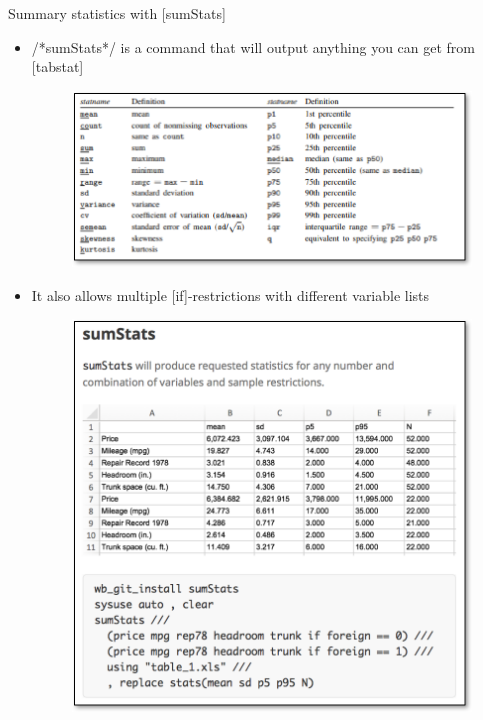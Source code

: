 \documentclass[aspectratio=169]{beamer}
\begin{document}
\begin{frame}[fragile]{Summary statistics with [sumStats]}
\begin{multicols}{2}	
	\begin{itemize}
		\item /*sumStats*/ is a command that will output anything you can get from [tabstat]
			\begin{figure}
				\centering
				\includegraphics[width=\linewidth]{img/sumstats}
			\end{figure}
		\item It also allows multiple [if]-restrictions with different variable lists
		\begin{figure}
			\centering
			\includegraphics[width=\linewidth]{img/sumstats2}
		\end{figure}
	\end{itemize}
\end{multicols}
\end{frame}
\end{document}

